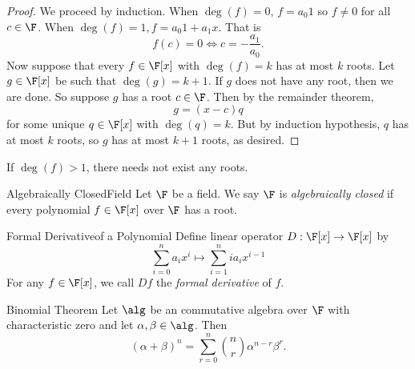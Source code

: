 \documentclass[linearalgebra]{subfiles}
\begin{document}
    \begin{proof}
        We proceed by induction. When $\deg(f) = 0$, $f = a_0 1$ so $f\neq 0$ for all $c\in \F$. When $\deg(f) = 1, f = a_0 1+a_1x$. That is
        \begin{equation*}
            f(c) = 0 \iff c = -\frac{a_1}{a_0}.
        \end{equation*}
        Now suppose that every $f\in \F[x]$ with $\deg(f) = k$ has at most $k$ roots. Let $g\in \F[x]$ be such that $\deg(g) = k+1$. If $g$ does not have any root, then we are done. So suppose $g$ has a root $c\in \F$. Then by the remainder theorem,
        \begin{equation*}
            g = (x-c)q
        \end{equation*}
        for some unique $q\in \F[x]$ with $\deg(q) = k$. But by induction hypothesis, $q$ has at most $k$ roots, so $g$ has at most $k+1$ roots, as desired.
    \end{proof}

    \begin{remark}
        If $\deg(f)>1$, there needs not exist any roots.
    \end{remark}

    \begin{definition}{Algebraically Closed}{Field}
        Let $\F$ be a field. We say $\F$ is \emph{algebraically closed} if every polynomial $f\in\F[x]$ over $\F$ has a root.
    \end{definition}

    \begin{definition}{Formal Derivative}{of a Polynomial}
        Define linear operator $D: \F[x]\to \F[x]$ by
        \begin{equation*}
            \sum^n_{i=0} a_ix^i\mapsto \sum^n_{i=1} ia_ix^{i-1} 
        \end{equation*}
        For any $f\in\F[x]$, we call $Df$ the \emph{formal derivative} of $f$.
    \end{definition}

    \begin{theorem}{Binomial Theorem}
        Let $\alg$ be an commutative algebra over $\F$ with characteristic zero and let $\alpha, \beta \in \alg$. Then
        \begin{equation*}
            (\alpha + \beta)^n = \sum^n_{r=0} \binom{n}{r} \alpha^{n-r}\beta^r.
        \end{equation*}
    \end{theorem}
\end{document}
